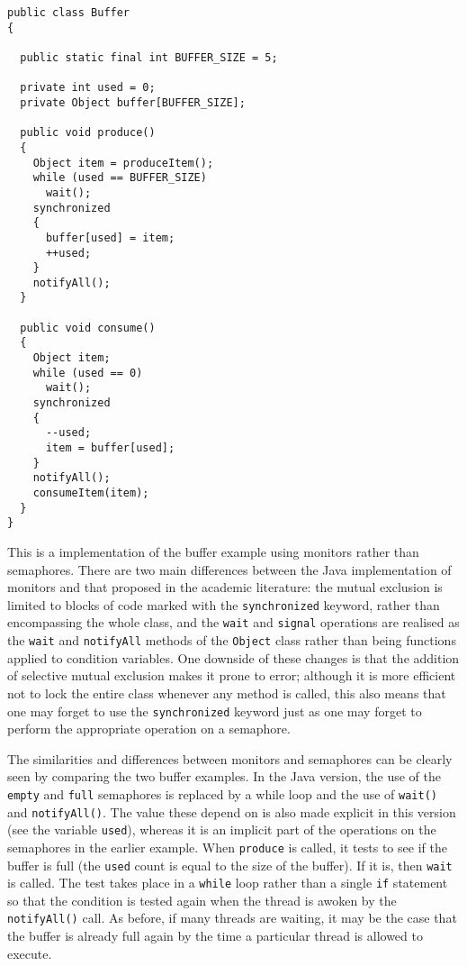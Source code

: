 \begin{verbatim}
public class Buffer
{

  public static final int BUFFER_SIZE = 5;

  private int used = 0;
  private Object buffer[BUFFER_SIZE];
  
  public void produce()
  {
    Object item = produceItem();
    while (used == BUFFER_SIZE)
      wait();
    synchronized
    {
      buffer[used] = item;
      ++used;
    }
    notifyAll();
  }

  public void consume()
  {
    Object item;
    while (used == 0)
      wait();
    synchronized
    {
      --used;
      item = buffer[used];
    }
    notifyAll();
    consumeItem(item);
  }
}
\end{verbatim}

This is a implementation of the buffer example using monitors rather
than semaphores.  There are two main differences between the Java
implementation of monitors and that proposed in the academic
literature: the mutual exclusion is limited to blocks of code marked
with the \texttt{synchronized} keyword, rather than encompassing the
whole class, and the \texttt{wait} and \texttt{signal} operations are
realised as the \texttt{wait} and \texttt{notifyAll} methods of the
\texttt{Object} class rather than being functions applied to condition
variables.  One downside of these changes is that the addition of
selective mutual exclusion makes it prone to error; although it is
more efficient not to lock the entire class whenever any method is
called, this also means that one may forget to use the
\texttt{synchronized} keyword just as one may forget to perform the
appropriate operation on a semaphore.

The similarities and differences between monitors and semaphores can
be clearly seen by comparing the two buffer examples.  In the Java
version, the use of the \texttt{empty} and \texttt{full} semaphores is
replaced by a while loop and the use of \texttt{wait()} and
\texttt{notifyAll()}.  The value these depend on is also made explicit
in this version (see the variable \texttt{used}), whereas it is an
implicit part of the operations on the semaphores in the earlier
example.  When \texttt{produce} is called, it tests to see if the
buffer is full (the \texttt{used} count is equal to the size of the
buffer).  If it is, then \texttt{wait} is called.  The test takes
place in a \texttt{while} loop rather than a single \texttt{if}
statement so that the condition is tested again when the thread is
awoken by the \texttt{notifyAll()} call.  As before, if many threads
are waiting, it may be the case that the buffer is already full again
by the time a particular thread is allowed to execute.

